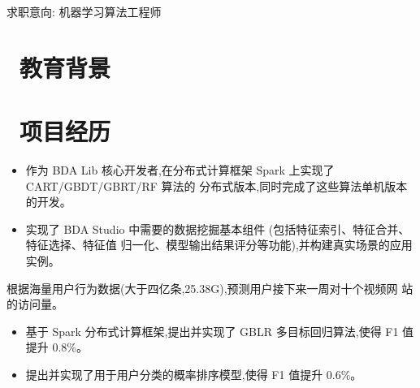 \documentclass{resume}
\begin{document}

\centerline{求职意向: 机器学习算法工程师}
\vspace{1ex}



\vspace{-1ex}
 
\section{\faGraduationCap\  教育背景}

\vspace{1ex}


\section{\faUsers\ 项目经历}
\begin{itemize}
  \item 作为 BDA Lib 核心开发者,在分布式计算框架 Spark 上实现了 CART/GBDT/GBRT/RF 算法的 分布式版本,同时完成了这些算法单机版本的开发。
  \item 实现了 BDA Studio 中需要的数据挖掘基本组件 (包括特征索引、特征合并、特征选择、特征值 归一化、模型输出结果评分等功能),并构建真实场景的应用实例。
\end{itemize}

\vspace{-1.5ex}

\begin{onehalfspacing}
根据海量用户行为数据(大于四亿条,25.38G),预测用户接下来一周对十个视频网
站的访问量。
\begin{itemize}
  \item 基于 Spark 分布式计算框架,提出并实现了 GBLR 多目标回归算法,使得 F1 值提升 0.8\%。
  \item 提出并实现了用于用户分类的概率排序模型,使得 F1 值提升 0.6\%。
\end{itemize}
\end{onehalfspacing}
\end{document}
